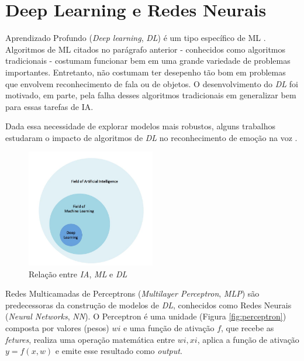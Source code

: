 \section{Deep Learning e Redes Neurais}

Aprendizado Profundo (\textit{Deep learning}, \textit{DL}) é um tipo específico de ML \cite{53}. Algoritmos de ML citados no parágrafo anterior - conhecidos como algoritmos tradicionais - costumam funcionar bem em uma grande variedade de problemas importantes. Entretanto, não costumam ter desepenho tão bom em problemas que envolvem reconhecimento de fala ou de objetos. O desenvolvimento do \textit{DL} foi motivado, em parte, pela falha desses algoritmos tradicionais em generalizar bem para essas tarefas de IA.

Dada essa necessidade de explorar modelos mais robustos, alguns trabalhos estudaram o impacto de algoritmos de \textit{DL} no reconhecimento de emoção na voz \cite{12.12} \cite{12.16}.

\begin{figure}[!h]
\centering
\includegraphics[width=0.5\textwidth]{imagens/ia-ml-dl.JPG}
\caption{\label{fig:ia-ml-dl}Relação entre \textit{IA}, \textit{ML} e \textit{DL}}

\author{Fonte: Retirada de \cite{58}}
\end{figure}

Redes Multicamadas de Perceptrons (\textit{Multilayer Perceptron}, \textit{MLP}) são predecessoras da construção de modelos de \textit{DL}, conhecidos como Redes Neurais (\textit{Neural Networks}, \textit{NN}). O Perceptron é uma unidade (Figura \ref{fig:perceptron}) composta por valores (pesos) $wi$ e uma função de ativação $f$,  que recebe as \textit{fetures}, realiza uma operação matemática entre $wi,xi$, aplica a função de ativação $y = f(x,w)$ e emite esse resultado como \textit{output}.

